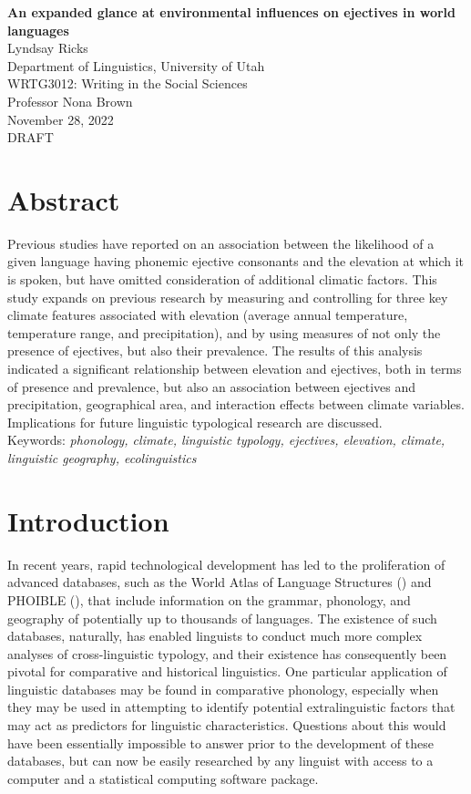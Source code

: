 \documentclass{article}
\begin{document}
\begin{titlepage}
	\centering
	\vspace*{0.2\textheight}
	\textbf{An expanded glance at environmental influences on ejectives in world languages}\\
	Lyndsay Ricks\\
	Department of Linguistics, University of Utah\\
	WRTG3012: Writing in the Social Sciences\\
	Professor Nona Brown\\
	November 28, 2022\\
	DRAFT
\end{titlepage}
\section*{Abstract}

Previous studies have reported on an association between the likelihood of a given language having phonemic ejective consonants and the elevation at which it is spoken, but have omitted consideration of additional climatic factors. This study expands on previous research by measuring and controlling for three key climate features associated with elevation (average annual temperature, temperature range, and precipitation), and by using measures of not only the presence of ejectives, but also their prevalence. The results of this analysis indicated a significant relationship between elevation and ejectives, both in terms of presence and prevalence, but also an association between ejectives and precipitation, geographical area, and interaction effects between climate variables. Implications for future linguistic typological research are discussed. \\

{\parindent0pt Keywords: \emph{phonology, climate, linguistic typology, ejectives, elevation, climate, linguistic geography, ecolinguistics}}

\pagebreak

\section{Introduction}
In recent years, rapid technological development has led to the proliferation of advanced databases, such as the World Atlas of Language Structures (\cite{wals}) and PHOIBLE (\cite{phoible}), that include information on the grammar, phonology, and geography of potentially up to thousands of languages. The existence of such databases, naturally, has enabled linguists to conduct much more complex analyses of cross-linguistic typology, and their existence has consequently been pivotal for comparative and historical linguistics. One particular application of linguistic databases may be found in comparative phonology, especially when they may be used in attempting to identify potential extralinguistic factors that may act as predictors for linguistic characteristics. Questions about this would have been essentially impossible to answer prior to the development of these databases, but can now be easily researched by any linguist with access to a computer and a statistical computing software package. 
\end{document}
